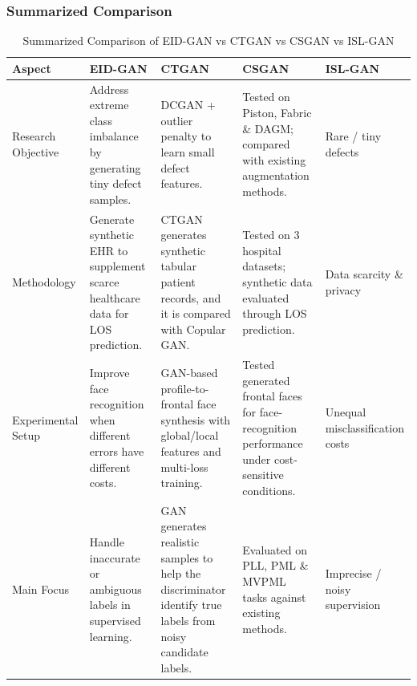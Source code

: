 \documentclass[12pt,a4paper]{article}
\begin{document}
\subsubsection{Summarized Comparison}
\begin{table}[H]
\caption{Summarized Comparison of EID-GAN vs CTGAN vs CSGAN vs ISL-GAN}
\label{tab:inclusion-exclusion}

\fontsize{10pt}{12pt}\selectfont

\begin{tabular}{|p{2cm}|p{3cm}|p{3cm}|p{3cm}|p{3cm}|}
\hline
\centering\textbf{Aspect} &
\centering\textbf{EID-GAN} &
\centering\textbf{CTGAN} &
\centering\textbf{CSGAN} &
\centering\textbf{ISL-GAN}
\tabularnewline
\hline

\centering Research Objective &
Address extreme class imbalance by generating tiny defect samples. &
DCGAN + outlier penalty to learn small defect features. &
Tested on Piston, Fabric \& DAGM; compared with existing augmentation methods. &
Rare / tiny defects
\tabularnewline 
\hline

\centering Methodology &
Generate synthetic EHR to supplement scarce healthcare data for LOS prediction. &
CTGAN generates synthetic tabular patient records, and it is compared with Copular GAN. &
Tested on 3 hospital datasets; synthetic data evaluated through LOS prediction. &
Data scarcity \& privacy
\tabularnewline
\hline

\centering Experimental Setup &
Improve face recognition when different errors have different costs. &
GAN-based profile-to-frontal face synthesis with global/local features and multi-loss training. &
Tested generated frontal faces for face-recognition performance under cost-sensitive conditions. &
Unequal misclassification costs
\tabularnewline
\hline

\centering Main Focus &
Handle inaccurate or ambiguous labels in supervised learning. &
GAN generates realistic samples to help the discriminator identify true labels from noisy candidate labels. &
Evaluated on PLL, PML \& MVPML tasks against existing methods. &
Imprecise / noisy supervision
\tabularnewline
\hline

\end{tabular}

\end{table}
\end{document}
